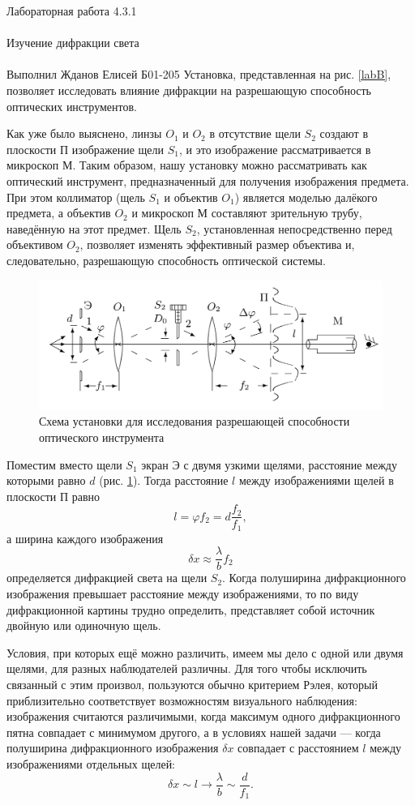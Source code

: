 \documentclass{astroedu-lab}
\begin{document}
\begin{problem}{\huge Лабораторная работа 4.3.1\\\\Изучение дифракции света\\\\Выполнил Жданов Елисей Б01-205}
Установка, представленная на рис. \ref{labB}, позволяет исследовать влияние дифракции на разрешающую способность оптических инструментов.

Как уже было выяснено, линзы $O_1$ и $ O_2$ в отсутствие щели $S_2$ создают в плоскости П изображение щели $S_1$, и это изображение рассматривается в микроскоп М. Таким образом, нашу установку можно рассматривать как оптический инструмент, предназначенный для получения изображения предмета. При этом коллиматор (щель $S_1$ и объектив $O_1$) является моделью далёкого предмета, а объектив $O_2$ и микроскоп М составляют зрительную трубу, наведённую на этот предмет.
Щель $S_2$, установленная непосредственно перед объективом $O_2$, позволяет изменять эффективный размер объектива и, следовательно, разрешающую способность оптической системы.

\begin{figure}[H]
	\centering
	\includegraphics[scale=0.15]{4.3.1/dlab.jpeg}
	\caption{Схема установки для исследования разрешающей
		способности оптического инструмента}
	\label{labG}
\end{figure}

Поместим вместо щели $S_1$ экран Э с двумя узкими щелями, расстояние между которыми равно $d$ (рис. \ref{labG}). Тогда расстояние $l$ между изображениями щелей в плоскости П равно
\begin{equation}
l = \varphi f_2 = d \dfrac{f_2}{f_1},
\end{equation}
а ширина каждого изображения
\begin{equation}
\delta x \approx \dfrac{\lambda}{b} f_2
\end{equation}
определяется дифракцией света на щели $S_2$. Когда полуширина дифракционного изображения превышает расстояние между изображениями, то по виду дифракционной картины трудно определить, представляет собой источник двойную или одиночную щель.

Условия, при которых ещё можно различить, имеем мы дело с одной или двумя щелями, для разных наблюдателей различны. Для того чтобы исключить связанный с этим произвол, пользуются обычно критерием Рэлея, который приблизительно соответствует возможностям визуального наблюдения: изображения считаются различимыми, когда максимум одного дифракционного пятна совпадает с минимумом другого, а в условиях нашей задачи --- когда полуширина дифракционного изображения $\delta x$ совпадает с расстоянием $l$ между изображениями отдельных щелей:
\begin{equation}
\delta x \sim l \to \dfrac{\lambda}{b} \sim \dfrac{d}{f_1}.
\end{equation}


\end{problem}
\end{document}
